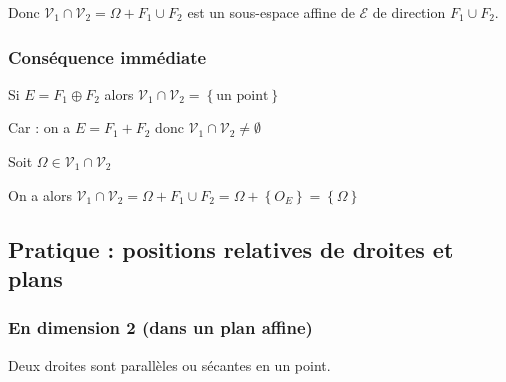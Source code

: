\documentclass[12pt,a4paper,french]{book}
\begin{document}
				Donc $\mathcal{V}_1 \cap\mathcal{V}_2 = \Omega + F_1 \cup F_2$ est un sous-espace affine de $\mathcal{E}$ de direction $ F_1 \cup F_2$.
			\subsubsection{Conséquence immédiate}
				Si $E = F_1 \oplus F_2 $ alors $\mathcal{V}_1 \cap\mathcal{V}_2 = \left\lbrace \mbox{un point}\right\rbrace $
				
				Car : on a $E = F_1 + F_2$ donc $\mathcal{V}_1 \cap\mathcal{V}_2 \neq \emptyset$
				
				Soit $\Omega \in \mathcal{V}_1 \cap\mathcal{V}_2$
				
				On a alors $\mathcal{V}_1 \cap\mathcal{V}_2 = \Omega + F_1 \cup F_2 = \Omega + \left\lbrace O_E \right\rbrace = \left\lbrace \Omega \right\rbrace $
		\subsection{Pratique : positions relatives de droites et plans}
			\subsubsection{En dimension 2 (dans un plan affine)}
				Deux droites sont parallèles ou sécantes en un point.
\end{document}
